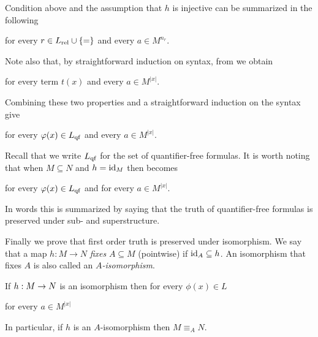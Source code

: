 \documentclass[creche.tex]{subfiles}
\begin{document}
Condition  above and the assumption that $h$ is injective can be summarized in the following

\hfill for every $r\in L_{\rm rel}\cup\{=\}$ and every $a\in M^{n_r}$.

Note also that, by straightforward induction on syntax, from  we obtain

\hfill for every term $t(x)$ and every  $a\in M^{|x|}$.

Combining these two properties and a straightforward induction on the syntax give 

\hfill for every $\phi(x)\in L_{\rm qf}$ and every $a\in M^{|x|}$.

Recall that we write $L_{\rm qf}$ for the set of quantifier-free formulas.
It is worth noting that when $M\subseteq N$ and $h=\id_M$ then  becomes  

\hfill for every $\phi(x)\in L_{\rm qf}$ and for every $a\in M^{|x|}$.

In words this is summarized by saying that the truth of quantifier-free formulas is preserved under sub- and superstructure.


\bigskip Finally we prove that first order truth is preserved under isomorphism.
We say that a map $h:M\to N$ \emph{fixes\/} $A\subseteq M$ (pointwise) if $\id_A\subseteq h$.
An isomorphism that fixes $A$ is also called an \emph{$A$-isomorphism}.

\begin{theorem}\label{isomorfoeleq}
If $h:M\imp N$ is an isomorphism then for every $\phi(x)\in L$

 for every $a\in M^{|x|}$

In particular, if $h$ is an $A$-isomorphism then $M\equiv_A N$.
\end{theorem}
\end{document}

